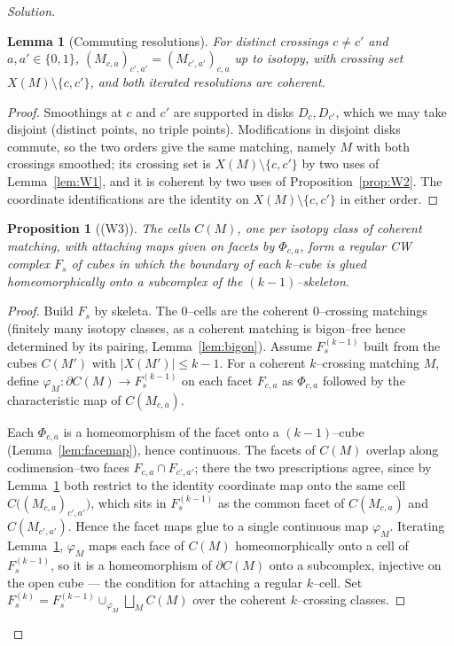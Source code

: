 \documentclass{amsart}
\newtheorem{lemma}{Lemma}
\newtheorem{proposition}{Proposition}
\theoremstyle{definition}
\newcommand{\bdy}{\partial}
\begin{document}
\begin{proof}[Solution]
\begin{lemma}[Commuting resolutions]\label{lem:commute}
For distinct crossings $c\neq c'$ and $a,a'\in\{0,1\}$,
$(M_{c,a})_{c',a'}=(M_{c',a'})_{c,a}$ up to isotopy, with crossing set
$X(M)\setminus\{c,c'\}$, and both iterated resolutions are coherent.
\end{lemma}

\begin{proof}
Smoothings at $c$ and $c'$ are supported in disks $D_c,D_{c'}$, which we may take disjoint
(distinct points, no triple points). Modifications in disjoint disks commute, so the two orders
give the same matching, namely $M$ with both crossings smoothed; its crossing set is
$X(M)\setminus\{c,c'\}$ by two uses of Lemma~\ref{lem:W1}, and it is coherent by two uses of
Proposition~\ref{prop:W2}. The coordinate identifications are the identity on
$X(M)\setminus\{c,c'\}$ in either order.
\end{proof}

\begin{proposition}[(W3)]\label{prop:W3}
The cells $C(M)$, one per isotopy class of coherent matching, with attaching maps given on facets
by $\Phi_{c,a}$, form a regular CW complex $F_s$ of cubes in which the boundary of each $k$–cube
is glued homeomorphically onto a subcomplex of the $(k-1)$–skeleton.
\end{proposition}

\begin{proof}
Build $F_s$ by skeleta. The $0$–cells are the coherent $0$–crossing matchings (finitely many
isotopy classes, as a coherent matching is bigon–free hence determined by its pairing,
Lemma~\ref{lem:bigon}). Assume $F_s^{(k-1)}$ built from the cubes $C(M')$ with $|X(M')|\le k-1$.
For a coherent $k$–crossing matching $M$, define $\varphi_M\colon\bdy C(M)\to F_s^{(k-1)}$ on each
facet $F_{c,a}$ as $\Phi_{c,a}$ followed by the characteristic map of $C(M_{c,a})$.

Each $\Phi_{c,a}$ is a homeomorphism of the facet onto a $(k-1)$–cube (Lemma~\ref{lem:facemap}),
hence continuous. The facets of $C(M)$ overlap along codimension–two faces $F_{c,a}\cap F_{c',a'}$;
there the two prescriptions agree, since by Lemma~\ref{lem:commute} both restrict to the identity
coordinate map onto the same cell $C\big((M_{c,a})_{c',a'}\big)$, which sits in $F_s^{(k-1)}$ as
the common facet of $C(M_{c,a})$ and $C(M_{c',a'})$. Hence the facet maps glue to a single
continuous map $\varphi_M$. Iterating Lemma~\ref{lem:commute}, $\varphi_M$ maps each face of
$C(M)$ homeomorphically onto a cell of $F_s^{(k-1)}$, so it is a homeomorphism of $\bdy C(M)$ onto
a subcomplex, injective on the open cube — the condition for attaching a regular $k$–cell. Set
$F_s^{(k)}=F_s^{(k-1)}\cup_{\varphi_M}\bigsqcup_M C(M)$ over the coherent $k$–crossing classes.


\end{proof}
\end{proof}
\end{document}

